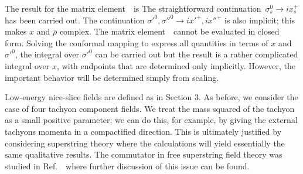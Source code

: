 The result for the matrix element~\bbone\ is
\eqn{}
The straightforward continuation~$\sigma_s^0 \to i x^+_s$ has been
carried out.  The continuation $\sigma'^0, \sigma''^0 \to ix'^+,
ix''^+$ is
also implicit; this makes $x$ and $\bar\rho$ complex.
The matrix element~\confin\ cannot be evaluated in closed form.
Solving the
conformal
mapping to express all quantities in terms of $x$ and $\sigma'^0$,
the
integral over $\sigma'^0$ can be carried out but the result is a
rather
complicated integral over $x$, with endpoints that are determined
only
implicitly.  However, the important behavior will be determined
simply from
scaling.


Low-energy nice-slice fields are defined as in Section 3.  As before,
we consider the case of four tachyon component fields.  We treat the
mass squared of the tachyon as a
small positive parameter; we can do this, for example, by giving the
external tachyons momenta in a compactified direction.  This is
ultimately
justified by  considering superstring theory where the calculations
will
yield essentially the same qualitative results.  The commutator in
free
superstring field theory was studied in Ref.~\lowe\ where further
discussion of this issue can be found.

